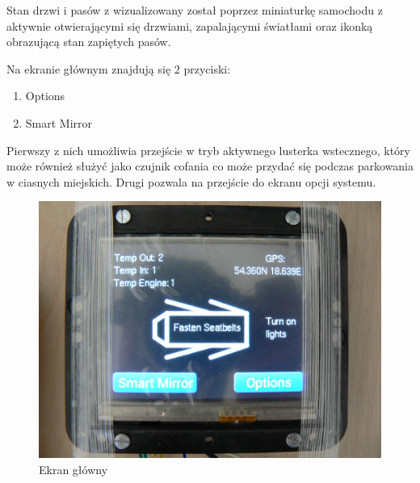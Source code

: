 \documentclass{xmgr}
\begin{document}
Stan drzwi i pasów z wizualizowany został poprzez miniaturkę samochodu z aktywnie otwierającymi się drzwiami, zapalającymi światłami oraz ikonką obrazującą stan zapiętych pasów.

Na ekranie głównym znajdują się 2 przyciski:
\begin{enumerate}
	\item Options
	\item Smart Mirror
\end{enumerate}

Pierwszy z nich umożliwia przejście w tryb aktywnego lusterka wstecznego, który może również służyć jako czujnik cofania co może przydać się podczas parkowania w ciasnych miejskich. Drugi pozwala na przejście do ekranu opcji systemu. 

\begin{figure}[!h]
    \centering
    	\includegraphics[height=0.3\textheight]{images/mainScreen.JPG}
    \caption{Ekran główny}
\end{figure}
\end{document}

